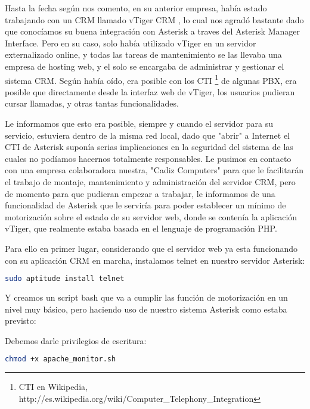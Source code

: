 Hasta la fecha según nos comento, en su anterior empresa, había estado trabajando con un CRM llamado vTiger CRM \cite{website:vtiger}, lo cual nos agradó bastante dado que conocíamos su buena integración con Asterisk a traves del Asterisk Manager Interface. Pero en su caso, solo había utilizado vTiger en un servidor externalizado online, y todas las tareas de mantenimiento se las llevaba una empresa de hosting web, y el solo se encargaba de administrar y gestionar el sistema CRM. Según había oído, era posible con los CTI \footnote{CTI en Wikipedia, http://es.wikipedia.org/wiki/Computer\_Telephony\_Integration} de algunas PBX, era posible que directamente desde la interfaz web de vTiger, los usuarios pudieran cursar llamadas, y otras tantas funcionalidades.

Le informamos que esto era posible, siempre y cuando el servidor para su servicio, estuviera dentro de la misma red local, dado que "abrir" a Internet el CTI de Asterisk suponía serias implicaciones en la seguridad del sistema de las cuales no podíamos hacernos totalmente responsables. Le pusimos en contacto con una empresa colaboradora nuestra, "Cadiz Computers" para que le facilitarán el trabajo de montaje, mantenimiento y administración del servidor CRM, pero de momento para que pudieran empezar a trabajar, le informamos de una funcionalidad de Asterisk que le serviría para poder establecer un mínimo de motorización sobre el estado de su servidor web, donde se contenía la aplicación vTiger, que realmente estaba basada en el lenguaje de programación PHP.

Para ello en primer lugar, considerando que el servidor web ya esta funcionando con su aplicación CRM en marcha, instalamos telnet en nuestro servidor Asterisk:

\begin{lstlisting}[language=sh]
sudo aptitude install telnet
\end{lstlisting}

Y creamos un script bash que va a cumplir las función de motorización en un nivel muy básico, pero haciendo uso de nuestro sistema Asterisk como estaba previsto:



Debemos darle privilegios de escritura:

\begin{lstlisting}[language=sh]
chmod +x apache_monitor.sh
\end{lstlisting}

